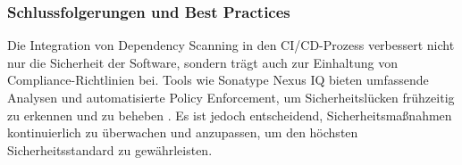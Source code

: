 \subsubsection{Schlussfolgerungen und Best Practices}

Die Integration von Dependency Scanning in den CI/CD-Prozess verbessert nicht nur die Sicherheit der Software, sondern trägt auch zur Einhaltung von Compliance-Richtlinien bei. Tools wie Sonatype Nexus IQ bieten umfassende Analysen und automatisierte Policy Enforcement, um Sicherheitslücken frühzeitig zu erkennen und zu beheben \cite{Sonatype2023}. Es ist jedoch entscheidend, Sicherheitsmaßnahmen kontinuierlich zu überwachen und anzupassen, um den höchsten Sicherheitsstandard zu gewährleisten.
